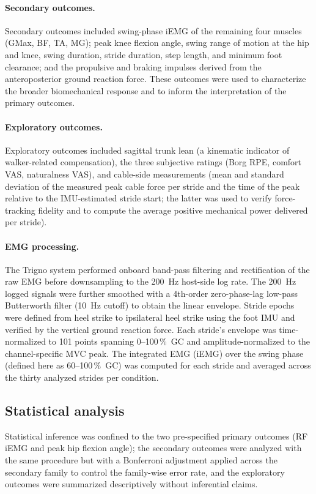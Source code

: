 \documentclass[11pt,a4paper]{article}
\begin{document}
\paragraph{Secondary outcomes.}
Secondary outcomes included swing-phase iEMG of the remaining four muscles (GMax, BF, TA, MG); peak knee flexion angle, swing range of motion at the hip and knee, swing duration, stride duration, step length, and minimum foot clearance; and the propulsive and braking impulses derived from the anteroposterior ground reaction force. These outcomes were used to characterize the broader biomechanical response and to inform the interpretation of the primary outcomes.

\paragraph{Exploratory outcomes.}
Exploratory outcomes included sagittal trunk lean (a kinematic indicator of walker-related compensation), the three subjective ratings (Borg RPE, comfort VAS, naturalness VAS), and cable-side measurements (mean and standard deviation of the measured peak cable force per stride and the time of the peak relative to the IMU-estimated stride start; the latter was used to verify force-tracking fidelity and to compute the average positive mechanical power delivered per stride).

\paragraph{EMG processing.}
The Trigno system performed onboard band-pass filtering and rectification of the raw EMG before downsampling to the 200~Hz host-side log rate. The 200~Hz logged signals were further smoothed with a 4th-order zero-phase-lag low-pass Butterworth filter (10~Hz cutoff) to obtain the linear envelope. Stride epochs were defined from heel strike to ipsilateral heel strike using the foot IMU and verified by the vertical ground reaction force. Each stride's envelope was time-normalized to 101 points spanning 0--100\,\%~GC and amplitude-normalized to the channel-specific MVC peak. The integrated EMG (iEMG) over the swing phase (defined here as 60--100\,\%~GC) was computed for each stride and averaged across the thirty analyzed strides per condition.

\subsection{Statistical analysis}
Statistical inference was confined to the two pre-specified primary outcomes (RF iEMG and peak hip flexion angle); the secondary outcomes were analyzed with the same procedure but with a Bonferroni adjustment applied across the secondary family to control the family-wise error rate, and the exploratory outcomes were summarized descriptively without inferential claims.
\end{document}
